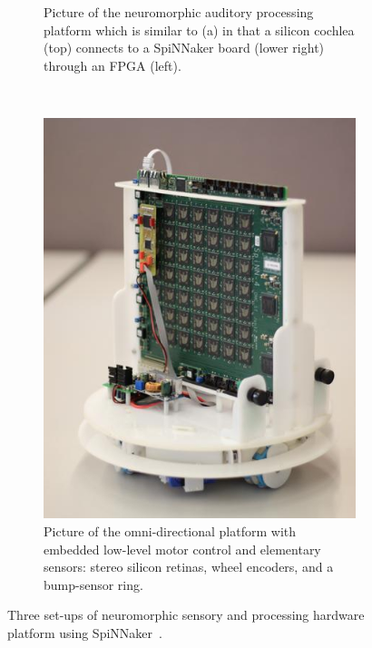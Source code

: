 \begin{figure}[tbp!]
\begin{subfigure}[t]{0.528\textwidth}
		\caption{Picture of the neuromorphic auditory processing platform which is similar to (a) in that a silicon cochlea (top) connects to a SpiNNaker board (lower right) through an FPGA (left).}
	\end{subfigure}
	~~
	\begin{subfigure}[t]{0.4\textwidth}
		\includegraphics[width=\textwidth]{pics_snn/omnibot.jpg}
		\caption{Picture of the omni-directional platform with embedded low-level motor control and elementary sensors: stereo silicon retinas, wheel encoders, and a bump-sensor ring.}
	\end{subfigure}
	\caption{Three set-ups of neuromorphic sensory and processing hardware platform using SpiNNaker~\citep{furber2014spinnaker}.}
	\label{Fig:close-loop}
\end{figure}

